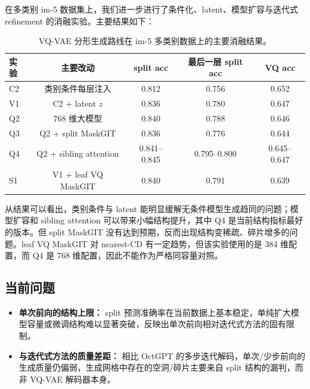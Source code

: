 \documentclass{article}
\begin{document}
在多类别 im-5 数据集上，我们进一步进行了条件化、latent、模型扩容与迭代式 refinement 的消融实验。主要结果如下：

\begin{table}[htbp]
    \centering
    \begin{tabular}{lcccc}
        \toprule
        实验 & 主要改动 & split acc & 最后一层 split acc & VQ acc \\
        \midrule
        C2 & 类别条件每层注入 & 0.812 & 0.756 & 0.652 \\
        V1 & C2 + latent $z$ & 0.836 & 0.780 & 0.647 \\
        Q2 & 768 维大模型 & 0.840 & 0.788 & 0.646 \\
        Q3 & Q2 + split MaskGIT & 0.836 & 0.776 & 0.644 \\
        Q4 & Q2 + sibling attention & 0.841--0.845 & 0.795--0.800 & 0.645--0.647 \\
        S1 & V1 + leaf VQ MaskGIT & 0.840 & 0.791 & 0.639 \\
        \bottomrule
    \end{tabular}
    \caption{VQ-VAE 分形生成路线在 im-5 多类别数据上的主要消融结果。}
\end{table}

从结果可以看出，类别条件与 latent 能明显缓解无条件模型生成趋同的问题；模型扩容和 sibling attention 可以带来小幅结构提升，其中 Q4 是当前结构指标最好的版本。但 split MaskGIT 没有达到预期，反而出现结构变稀疏、碎片增多的问题。leaf VQ MaskGIT 对 nearest-CD 有一定趋势，但该实验使用的是 384 维配置，而 Q4 是 768 维配置，因此不能作为严格同容量对照。

\subsection{当前问题}
\begin{itemize}
    \item \textbf{单次前向的结构上限：} split 预测准确率在当前数据上基本稳定，单纯扩大模型容量或微调结构难以显著突破，反映出单次前向相对迭代式方法的固有限制。
    \item \textbf{与迭代式方法的质量差距：} 相比 OctGPT 的多步迭代解码，单次/少步前向的生成质量仍偏弱，生成网格中存在的空洞/碎片主要来自 split 结构的漏判，而非 VQ-VAE 解码器本身。
\end{itemize}

\end{document}
